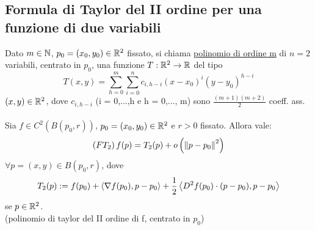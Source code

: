 \subsection{Formula di Taylor del II ordine per una funzione di due variabili}
\begin{definition}
  Dato $m \in \mathbb{N}$, $p_0 = (x_0,y_0) \in \mathbb{R}^2$ fissato, si chiama \underline{polinomio di ordine m} di $n=2$ variabili,
  centrato in $p_0$, una funzione $T: \mathbb{R}^2 \to \mathbb{R}$ del tipo
  $$T(x,y) = \sum_{h=0}^{m} \sum_{i = 0}^n c_{i,h-i} (x-x_0)^i(y-y_0)^{h-i}$$
  $(x,y)\in \mathbb{R}^2$, dove $c_{i,h-i}$ (i = 0,...,h e h = 0,..., m) sono $\frac{(m+1)(m+2)}{2}$ coeff. ass. \\\\
  Sia $f \in C^2\left(B(p_0,r)\right)$, $p_0 = (x_0,y_0) \in \mathbb{R}^2$ e $r > 0$ fissato. Allora vale:
  $$\left(FT_2\right) f(p) = T_2(p) + o\left(\left\lVert p-p_0\right\rVert^2\right)$$
  $\forall p = (x,y) \in B(p_0,r)$, dove 
  $$T_2(p) := f(p_0) + \left\langle \nabla f(p_0), p-p_0 \right\rangle + \frac{1}{2} \left\langle D^2f(p_0) \cdot (p-p_0), p-p_0 \right\rangle$$
  se $p \in \mathbb{R}^2$. \\
  (polinomio di taylor del II ordine di f, centrato in $p_0$) 
\end{definition}